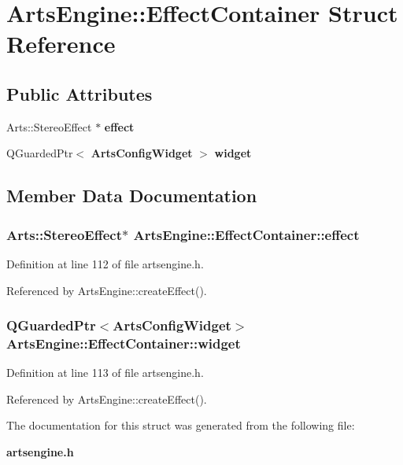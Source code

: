 \section{Arts\-Engine::Effect\-Container Struct Reference}
\label{structArtsEngine_1_1EffectContainer}
\subsection*{Public Attributes}
\begin{CompactItemize}
\item 
Arts::Stereo\-Effect $\ast$ {\bf effect}
\item 
QGuarded\-Ptr$<$ {\bf Arts\-Config\-Widget} $>$ {\bf widget}
\end{CompactItemize}


\subsection{Member Data Documentation}
\subsubsection{\setlength{\rightskip}{0pt plus 5cm}Arts::Stereo\-Effect$\ast$ {\bf Arts\-Engine::Effect\-Container::effect}}\label{structArtsEngine_1_1EffectContainer_ArtsEngine_1_1EffectContainero0}




Definition at line 112 of file artsengine.h.

Referenced by Arts\-Engine::create\-Effect().
\subsubsection{\setlength{\rightskip}{0pt plus 5cm}QGuarded\-Ptr$<${\bf Arts\-Config\-Widget}$>$ {\bf Arts\-Engine::Effect\-Container::widget}}\label{structArtsEngine_1_1EffectContainer_ArtsEngine_1_1EffectContainero1}




Definition at line 113 of file artsengine.h.

Referenced by Arts\-Engine::create\-Effect().

The documentation for this struct was generated from the following file:\begin{CompactItemize}
\item 
{\bf artsengine.h}\end{CompactItemize}
